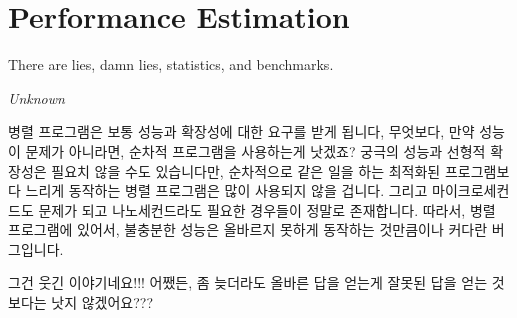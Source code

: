 \section{Performance Estimation}
\label{sec:debugging:Performance Estimation}
%
\epigraph{There are lies, damn lies, statistics, and benchmarks.}
	 {\emph{Unknown}}

병렬 프로그램은 보통 성능과 확장성에 대한 요구를 받게 됩니다, 무엇보다, 만약
성능이 문제가 아니라면, 순차적 프로그램을 사용하는게 낫겠죠?
궁극의 성능과 선형적 확장성은 필요치 않을 수도 있습니다만, 순차적으로 같은 일을
하는 최적화된 프로그램보다 느리게 동작하는 병렬 프로그램은 많이 사용되지 않을
겁니다.
그리고 마이크로세컨드도 문제가 되고 나노세컨드라도 필요한 경우들이 정말로
존재합니다.
따라서, 병렬 프로그램에 있어서, 불충분한 성능은 올바르지 못하게 동작하는
것만큼이나 커다란 버그입니다.

\QuickQuiz{}
	그건 웃긴 이야기네요!!!
	어쨌든, 좀 늦더라도 올바른 답을 얻는게 잘못된 답을 얻는 것보다는 낫지
	않겠어요???
	\iffalse

